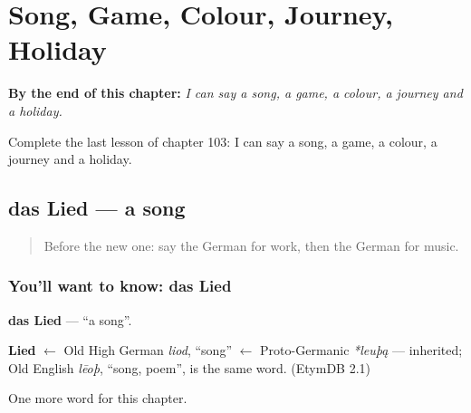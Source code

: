 
\chapter{Song, Game, Colour, Journey, Holiday}
\label{ch:ge-song-game-colour-journey-holiday}

\begin{chapteropening}
\textbf{By the end of this chapter:} \emph{I can say a song, a game, a colour, a journey and a holiday.}

Complete the last lesson of chapter 103: I can say a song, a game, a colour, a journey and a holiday.
\end{chapteropening}

\section[das Lied]{das Lied — a song}

\label{lesson:GE-C103-lied}



\begin{quote}
Before the new one: say the German for work, then the German for music.
\end{quote}

\subsection*{You'll want to know: das Lied}
\textbf{das Lied} — \textquotedblleft{}a song\textquotedblright{}.

\begin{cousinweb}
\textbf{Lied} $\leftarrow$ Old High German \emph{liod}, \textquotedblleft{}song\textquotedblright{} $\leftarrow$ Proto-Germanic \emph{*leuþą} — inherited; Old English \emph{lēoþ}, \textquotedblleft{}song, poem\textquotedblright{}, is the same word. (EtymDB 2.1)
\end{cousinweb}

\begin{grammarlens}[title={What you've built}]
One more word for this chapter.
\end{grammarlens}

